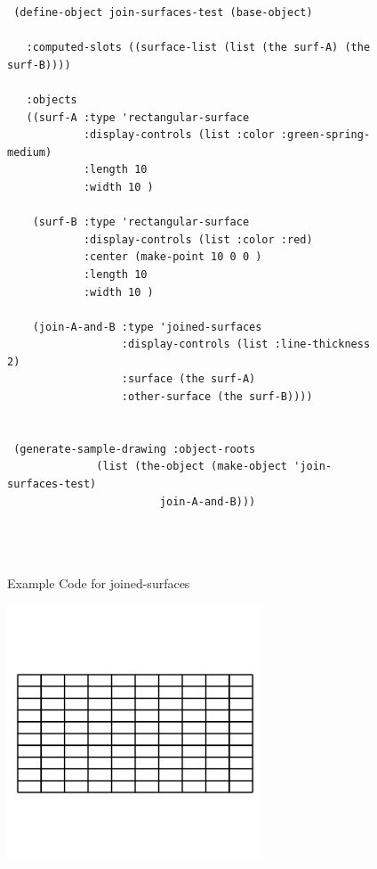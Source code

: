 \documentclass [11pt]{book}
\begin{document}
\begin{itemize}
\begin{figure}
\begin{lrbox}{\boxedverb}
\begin{minipage}{\linewidth}
{\begin{verbatim}
 (define-object join-surfaces-test (base-object) 

   :computed-slots ((surface-list (list (the surf-A) (the surf-B))))
  
   :objects
   ((surf-A :type 'rectangular-surface
            :display-controls (list :color :green-spring-medium)
            :length 10
            :width 10 )
                                        
    (surf-B :type 'rectangular-surface
            :display-controls (list :color :red)
            :center (make-point 10 0 0 )
            :length 10
            :width 10 )
   
    (join-A-and-B :type 'joined-surfaces
                  :display-controls (list :line-thickness 2)
                  :surface (the surf-A)
                  :other-surface (the surf-B))))


 (generate-sample-drawing :object-roots 
			  (list (the-object (make-object 'join-surfaces-test) 
					    join-A-and-B)))
 

 
\end{verbatim}}
\end{minipage}
\end{lrbox}
\fbox{\usebox{\boxedverb}}

\caption{Example Code for joined-surfaces}

\label{fig:example-code-joined-surfaces}

\end{figure}

\begin{figure}
\begin{center}
\includegraphics[width=3in,height=3in]{../images/example-joined-surfaces.pdf}
\end{center}


\end{figure}
\end{itemize}
\end{document}

